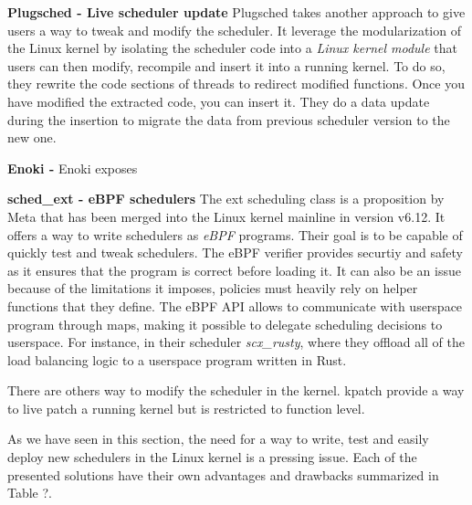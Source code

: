 \par \textbf{Plugsched - Live scheduler update} Plugsched takes another approach to give users a way to tweak and modify the scheduler. It leverage the modularization of the Linux kernel by isolating the scheduler code into a \textit{Linux kernel module} that users can then modify, recompile and insert it into a running kernel. To do so, they rewrite the code sections of threads to redirect modified functions. Once you have modified the extracted code, you can insert it. They do a data update during the insertion to migrate the data from previous scheduler version to the new one.

\par \textbf{Enoki - } Enoki exposes 

\par \textbf{sched\_ext - eBPF schedulers} The ext scheduling class is a proposition by Meta that has been merged into the Linux kernel mainline in version v6.12. It offers a way to write schedulers as \textit{eBPF} programs. Their goal is to be capable of quickly test and tweak schedulers. The eBPF verifier provides securtiy and safety as it ensures that the program is correct before loading it. It can also be an issue because of the limitations it imposes, policies must heavily rely on helper functions that they define. The eBPF API allows to communicate with userspace program through maps, making it possible to delegate scheduling decisions to userspace. For instance, in their scheduler \textit{scx\_rusty}, where they offload all of the load balancing logic to a userspace program written in Rust.

\par There are others way to modify the scheduler in the kernel. kpatch\cite{} provide a way to live patch a running kernel but is restricted to function level. 
\par As we have seen in this section, the need for a way to write, test and easily deploy new schedulers in the Linux kernel is a pressing issue. Each of the presented solutions have their own advantages and drawbacks summarized in Table ?.